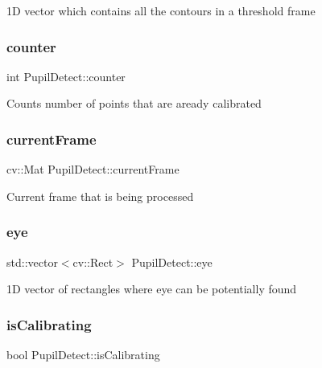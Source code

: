 1D vector which contains all the contours in a threshold frame \mbox{\label{class_pupil_detect_a6fc0c70df2b083d7c24be0a4dff9d7a5}} 
\subsubsection{\texorpdfstring{counter}{counter}}
{\footnotesize\ttfamily int Pupil\+Detect\+::counter\hspace{0.3cm}{\ttfamily [private]}}

Counts number of points that are aready calibrated \mbox{\label{class_pupil_detect_a2573a2415b451c876ab47a0ef016ec18}} 
\subsubsection{\texorpdfstring{current\+Frame}{currentFrame}}
{\footnotesize\ttfamily cv\+::\+Mat Pupil\+Detect\+::current\+Frame\hspace{0.3cm}{\ttfamily [private]}}

Current frame that is being processed \mbox{\label{class_pupil_detect_aee60f1bd292f20e41057139483c9d940}} 
\subsubsection{\texorpdfstring{eye}{eye}}
{\footnotesize\ttfamily std\+::vector$<$cv\+::\+Rect$>$ Pupil\+Detect\+::eye\hspace{0.3cm}{\ttfamily [private]}}

1D vector of rectangles where eye can be potentially found \mbox{\label{class_pupil_detect_ad4192b7bc071abfed746e463f383b866}} 
\subsubsection{\texorpdfstring{is\+Calibrating}{isCalibrating}}
{\footnotesize\ttfamily bool Pupil\+Detect\+::is\+Calibrating\hspace{0.3cm}{\ttfamily [private]}}

